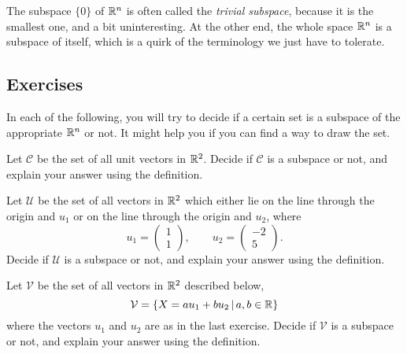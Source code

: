 \documentclass[elementsmain.tex]{subfiles}
\begin{document}
\begin{remark}
The subspace $\{0\}$ of $\mathbb{R}^n$ is often called the \emph{trivial subspace}, because it is the smallest one, and a bit uninteresting. At the other end, the whole space $\mathbb{R}^n$ is a subspace of itself, which is a quirk of the terminology we just have to tolerate.
\end{remark}



\clearpage
\subsection*{Exercises}

In each of the following, you will try to decide if a certain set is a subspace of the appropriate $\mathbb{R}^n$ or not. It might help you if you can find a way to draw the set.


\begin{exercise} Let $\mathcal{C}$ be the set of all unit vectors in $\mathbb{R}^2$. Decide if $\mathcal{C}$ is a subspace or not, and explain your answer using the definition.
\end{exercise}

\begin{exercise}
Let $\mathcal{U}$ be the set of all vectors in $\mathbb{R}^2$ which either lie on the line through the origin and $u_1$ or on the line through the origin and $u_2$, where
\begin{equation*}
u_1 = \begin{pmatrix} 1\\1 \end{pmatrix}, \qquad u_2 = \begin{pmatrix} -2\\5\end{pmatrix}.
\end{equation*}
Decide if $\mathcal{U}$ is a subspace or not, and explain your answer using the definition.
\end{exercise}

\begin{exercise}
Let $\mathcal{V}$ be the set of all vectors in $\mathbb{R}^2$ described below, 
\begin{equation*}
\mathcal{V} = \left\{ X = a u_1 + b u_2 \,\middle|\, a, b \in \mathbb{R} \right\}
\end{equation*}
where the vectors $u_1$ and $u_2$ are as in the last exercise.
Decide if $\mathcal{V}$ is a subspace or not, and explain your answer using the definition.
\end{exercise}
\end{document}
